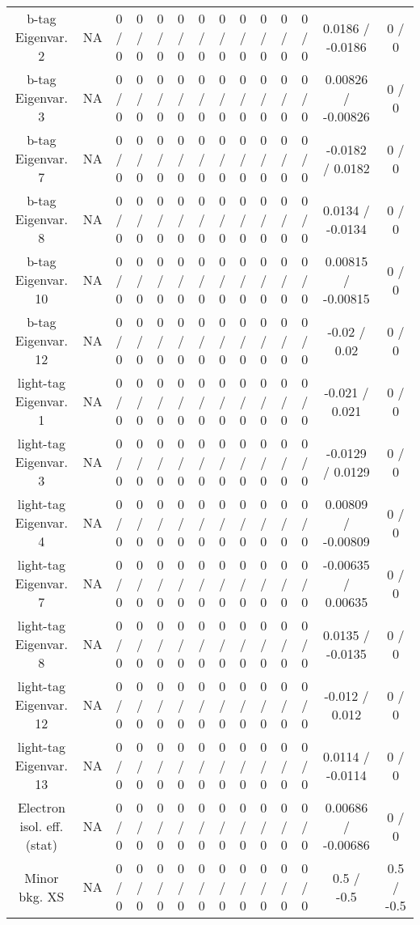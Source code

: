 \documentclass[10pt]{article}
\begin{document}
\begin{table}[htbp]
\begin{center}
\begin{tabular}{|c|c|c|c|c|c|c|c|c|c|c|c|c|c|}
  b-tag Eigenvar. 2 &    NA    & 0 / 0 & 0 / 0 & 0 / 0 & 0 / 0 & 0 / 0 & 0 / 0 & 0 / 0 & 0 / 0 & 0 / 0 & 0 / 0 & 0.0186 / -0.0186 & 0 / 0 \\ 
  b-tag Eigenvar. 3 &    NA    & 0 / 0 & 0 / 0 & 0 / 0 & 0 / 0 & 0 / 0 & 0 / 0 & 0 / 0 & 0 / 0 & 0 / 0 & 0 / 0 & 0.00826 / -0.00826 & 0 / 0 \\ 
  b-tag Eigenvar. 7 &    NA    & 0 / 0 & 0 / 0 & 0 / 0 & 0 / 0 & 0 / 0 & 0 / 0 & 0 / 0 & 0 / 0 & 0 / 0 & 0 / 0 & -0.0182 / 0.0182 & 0 / 0 \\ 
  b-tag Eigenvar. 8 &    NA    & 0 / 0 & 0 / 0 & 0 / 0 & 0 / 0 & 0 / 0 & 0 / 0 & 0 / 0 & 0 / 0 & 0 / 0 & 0 / 0 & 0.0134 / -0.0134 & 0 / 0 \\ 
  b-tag Eigenvar. 10 &    NA    & 0 / 0 & 0 / 0 & 0 / 0 & 0 / 0 & 0 / 0 & 0 / 0 & 0 / 0 & 0 / 0 & 0 / 0 & 0 / 0 & 0.00815 / -0.00815 & 0 / 0 \\ 
  b-tag Eigenvar. 12 &    NA    & 0 / 0 & 0 / 0 & 0 / 0 & 0 / 0 & 0 / 0 & 0 / 0 & 0 / 0 & 0 / 0 & 0 / 0 & 0 / 0 & -0.02 / 0.02 & 0 / 0 \\ 
  light-tag Eigenvar. 1 &    NA    & 0 / 0 & 0 / 0 & 0 / 0 & 0 / 0 & 0 / 0 & 0 / 0 & 0 / 0 & 0 / 0 & 0 / 0 & 0 / 0 & -0.021 / 0.021 & 0 / 0 \\ 
  light-tag Eigenvar. 3 &    NA    & 0 / 0 & 0 / 0 & 0 / 0 & 0 / 0 & 0 / 0 & 0 / 0 & 0 / 0 & 0 / 0 & 0 / 0 & 0 / 0 & -0.0129 / 0.0129 & 0 / 0 \\ 
  light-tag Eigenvar. 4 &    NA    & 0 / 0 & 0 / 0 & 0 / 0 & 0 / 0 & 0 / 0 & 0 / 0 & 0 / 0 & 0 / 0 & 0 / 0 & 0 / 0 & 0.00809 / -0.00809 & 0 / 0 \\ 
  light-tag Eigenvar. 7 &    NA    & 0 / 0 & 0 / 0 & 0 / 0 & 0 / 0 & 0 / 0 & 0 / 0 & 0 / 0 & 0 / 0 & 0 / 0 & 0 / 0 & -0.00635 / 0.00635 & 0 / 0 \\ 
  light-tag Eigenvar. 8 &    NA    & 0 / 0 & 0 / 0 & 0 / 0 & 0 / 0 & 0 / 0 & 0 / 0 & 0 / 0 & 0 / 0 & 0 / 0 & 0 / 0 & 0.0135 / -0.0135 & 0 / 0 \\ 
  light-tag Eigenvar. 12 &    NA    & 0 / 0 & 0 / 0 & 0 / 0 & 0 / 0 & 0 / 0 & 0 / 0 & 0 / 0 & 0 / 0 & 0 / 0 & 0 / 0 & -0.012 / 0.012 & 0 / 0 \\ 
  light-tag Eigenvar. 13 &    NA    & 0 / 0 & 0 / 0 & 0 / 0 & 0 / 0 & 0 / 0 & 0 / 0 & 0 / 0 & 0 / 0 & 0 / 0 & 0 / 0 & 0.0114 / -0.0114 & 0 / 0 \\ 
  Electron isol. eff. (stat) &    NA    & 0 / 0 & 0 / 0 & 0 / 0 & 0 / 0 & 0 / 0 & 0 / 0 & 0 / 0 & 0 / 0 & 0 / 0 & 0 / 0 & 0.00686 / -0.00686 & 0 / 0 \\ 
  Minor bkg. XS &    NA    & 0 / 0 & 0 / 0 & 0 / 0 & 0 / 0 & 0 / 0 & 0 / 0 & 0 / 0 & 0 / 0 & 0 / 0 & 0 / 0 & 0.5 / -0.5 & 0.5 / -0.5 \\ 

\end{tabular}
\end{center}
\end{table}
\end{document}
